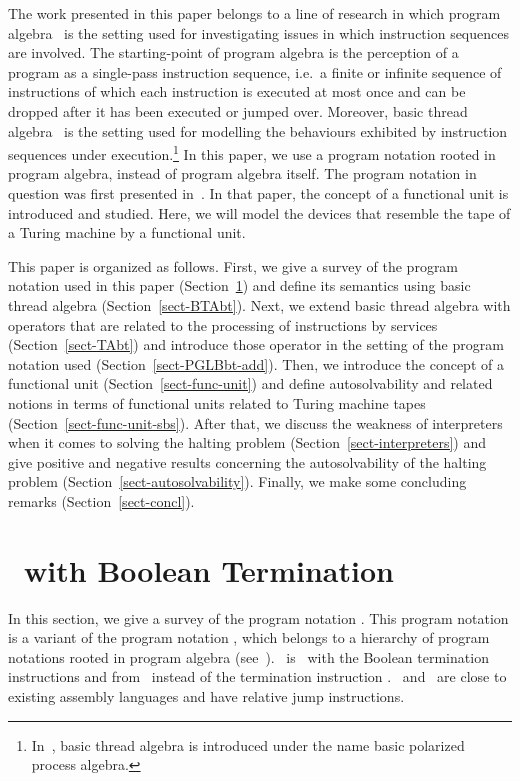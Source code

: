 \documentclass[fleqn]{llncs}
\begin{document}
The work presented in this paper belongs to a line of research in which
program algebra~\cite{BL02a} is the setting used for investigating
issues in which instruction sequences are involved.
The starting-point of program algebra is the perception of a program as
a single-pass instruction sequence, i.e.\ a finite or infinite sequence
of instructions of which each instruction is executed at most once and
can be dropped after it has been executed or jumped over.
Moreover, basic thread algebra~\cite{BL02a} is the setting used for
modelling the behaviours exhibited by instruction sequences under
execution.\footnote
{In~\cite{BL02a}, basic thread algebra is introduced under the name
 basic polarized process algebra.
}
In this paper, we use a program notation rooted in program algebra,
instead of program algebra itself.
The program notation in question was first presented in~\cite{BM09l}.
In that paper, the concept of a functional unit is introduced and
studied.
Here, we will model the devices that resemble the tape of a Turing
machine by a functional unit.

This paper is organized as follows.
First, we give a survey of the program notation used in this paper
(Section~\ref{sect-PGLBbt}) and define its semantics using basic thread
algebra (Section~\ref{sect-BTAbt}).
Next, we extend basic thread algebra with operators that are related to
the processing of instructions by services (Section~\ref{sect-TAbt}) and
introduce those operator in the setting of the program notation used
(Section~\ref{sect-PGLBbt-add}).
Then, we introduce the concept of a functional unit
(Section~\ref{sect-func-unit}) and define autosolvability and related
notions in terms of functional units related to Turing machine tapes
(Section~\ref{sect-func-unit-sbs}).
After that, we discuss the weakness of interpreters when it comes to
solving the halting problem (Section~\ref{sect-interpreters}) and give
positive and negative results concerning the autosolvability of the
halting problem (Section~\ref{sect-autosolvability}).
Finally, we make some concluding remarks (Section~\ref{sect-concl}).

\section{\PGLB\ with Boolean Termination}
\label{sect-PGLBbt}

In this section, we give a survey of the program notation \PGLBbt.
This program notation is a variant of the program notation \PGLB, which
belongs to a hierarchy of program notations rooted in program algebra
(see~\cite{BL02a}).
\PGLBbt\ is \PGLB\ with the Boolean termination instructions 
and  from~\cite{BM09k} instead of the termination instruction
.
\PGLB\ and \PGLBbt\ are close to existing assembly languages and have
relative jump instructions.
\end{document}
